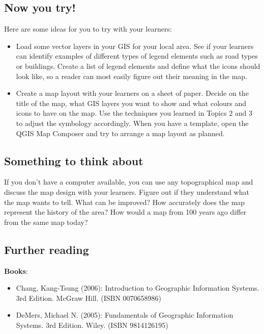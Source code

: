 \subsection{Now you try!}

Here are some ideas for you to try with your learners:

\begin{itemize}
\item Load some vector layers in your GIS for your local area. See if your learners
can identify examples of different types of legend elements such as road
types or buildings. Create a list of legend elements and define what the
icons should look like, so a reader can most easily figure out their meaning
in the map.
\item Create a map layout with your learners on a sheet of paper. Decide on the
title of the map, what GIS layers you want to show and what colours and icons
to have on the map. Use the techniques you learned in Topics 2 and 3 to
adjust the symbology accordingly. When you have a template,  open the QGIS
Map Composer and try to arrange a map layout as planned.
\end{itemize}

\subsection{Something to think about}

If you don't have a computer available, you can use any topographical map and
discuss the map design with your learners. Figure out if they understand what
the map wants to tell. What can be improved? How accurately does the map
represent the history of the area? How would a map from 100 years ago differ
from the same map today?

\subsection{Further reading}

\textbf{Books}: 

\begin{itemize}
\item Chang, Kang-Tsung (2006): Introduction to Geographic Information Systems. 3rd
Edition.  McGraw Hill. (ISBN 0070658986)
\item DeMers, Michael N. (2005): Fundamentals of Geographic Information Systems.
3rd Edition. Wiley. (ISBN 9814126195)
\end{itemize}

